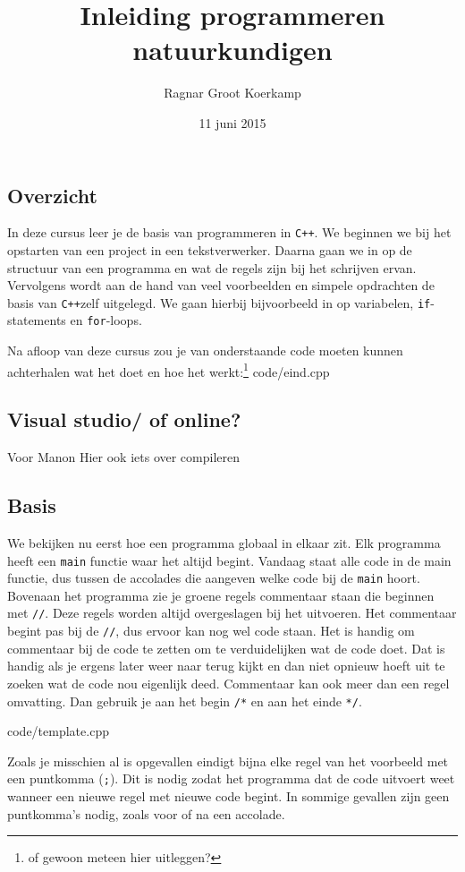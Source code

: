 \documentclass[12pt,a4paper]{article}
\title{Inleiding programmeren natuurkundigen}
\author{Ragnar Groot Koerkamp}
\date{11 juni 2015}
\newcommand{\code}{}
\newcommand{\icode}{\lstinline}
\newcommand{\mono}{\texttt}
\newcommand{\cpp}{\mono{C++}}
\begin{document}
 
\maketitle

\tableofcontents
\subsection{Overzicht}
In deze cursus leer je de basis van programmeren in \cpp. We beginnen we bij het opstarten van een project in een tekstverwerker. Daarna gaan we in op de structuur van een programma en wat de regels zijn bij het schrijven ervan. Vervolgens wordt aan de hand van veel voorbeelden en simpele opdrachten de basis van \cpp zelf uitgelegd. We gaan hierbij bijvoorbeeld in op variabelen, \icode{if}-statements en \icode{for}-loops.

Na afloop van deze cursus zou je van onderstaande code moeten kunnen achterhalen wat het doet en hoe het werkt:\footnote{of gewoon meteen hier uitleggen?}
\code{code/eind.cpp}
\subsection{Visual studio/ of online?}
Voor Manon
Hier ook iets over compileren
\subsection{Basis}
We bekijken nu eerst hoe een programma globaal in elkaar zit. Elk programma heeft een \icode{main} functie waar het altijd begint. Vandaag staat alle code in de main functie, dus tussen de accolades die aangeven welke code bij de \icode{main} hoort.
Bovenaan het programma zie je groene regels commentaar staan die beginnen met \icode{//}. Deze regels worden altijd overgeslagen bij het uitvoeren. Het commentaar begint pas bij de \icode{//}, dus ervoor kan nog wel code staan. Het is handig om commentaar bij de code te zetten om te verduidelijken wat de code doet. Dat is handig als je ergens later weer naar terug kijkt en dan niet opnieuw hoeft uit te zoeken wat de code nou eigenlijk deed. Commentaar kan ook meer dan een regel omvatting. Dan gebruik je aan het begin \icode{/*} en aan het einde \icode{*/}.

\code{code/template.cpp}

Zoals je misschien al is opgevallen eindigt bijna elke regel van het voorbeeld met een puntkomma (\icode{;}). Dit is nodig zodat het programma dat de code uitvoert weet wanneer een nieuwe regel met nieuwe code begint. In sommige gevallen zijn geen puntkomma's nodig, zoals voor of na een accolade.
\end{document}
